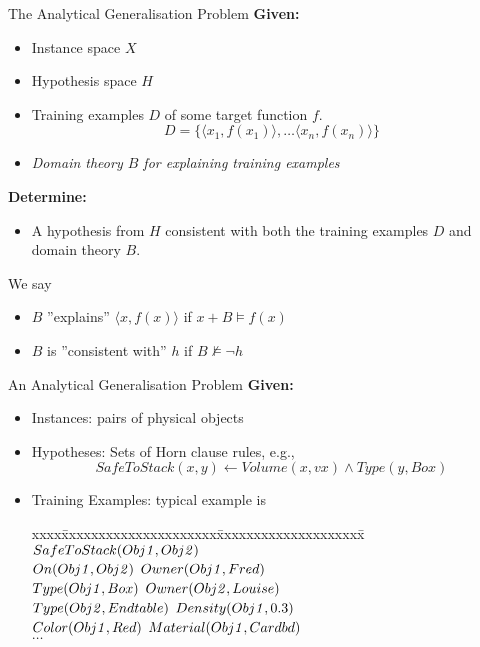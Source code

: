 \documentclass[%
pdf,
colorBG,
slideColor,
tcrico,
]{prosper}
\begin{document}

\begin{slide}{The Analytical Generalisation Problem}
\tiny
	{\bf Given:}
	\begin{itemize}
	\item Instance space $X$
	\item Hypothesis space $H$
	\item Training examples $D$ of some target function $f$. 
	\[ D = \{
	\langle x_{1}, f(x_{1}) \rangle, \dots \langle x_{n}, f(x_{n}) \rangle
	\} \]
	\item {\em Domain theory $B$ for explaining training examples}
	\end{itemize}
	
	{\bf Determine:}
	\begin{itemize}
	\item A hypothesis from $H$ consistent with both the training examples $D$ and domain
	theory $B$.
	\end{itemize}
	
	We say 
	\begin{itemize}
	\item
	$B$ ''explains'' $\langle x, f(x) \rangle$ if $x + B \models f(x)$  
	\item
	$B$ is ''consistent with'' $h$ if  $B \not \models \neg h$
	\end{itemize}
\end{slide}


\begin{slide}{An Analytical Generalisation Problem}
\tiny
	{\bf Given:}
	\begin{itemize}
	\item Instances: pairs of physical objects
	\item Hypotheses:  Sets of Horn clause rules, e.g.,
	\[ SafeToStack(x,y) \gets Volume(x, vx) \wedge Type(y,Box) \]
	
	\item Training Examples: typical example is
	\begin{tabbing}
	\vspace{-.25 in}
	xxxx\=xxxxxxxxxxxxxxxxxxxxx\=xxxxxxxxxxxxxxxxxxxx\= \kill 
	$SafeToStack(Obj{\it 1}, Obj{\it 2})$ \\
	\>\hskip-20pt$On(Obj{\it 1},Obj{\it 2})$	\>$Owner(Obj{\it 1}, Fred)$ \\
	\>\hskip-20pt$Type(Obj{\it 1},Box)$	\>$Owner(Obj{\it 2}, Louise)$ \\
	\>\hskip-20pt$Type(Obj{\it 2},Endtable)$ \>$Density(Obj{\it 1},0.3)$ \\
	\>\hskip-20pt$Color(Obj{\it 1},Red)$	\>$Material(Obj{\it 1}, Cardbd)$ \\
	\>\hskip-20pt$\ldots$
	\end{tabbing}
\end{itemize}
\end{slide}
\end{document}
